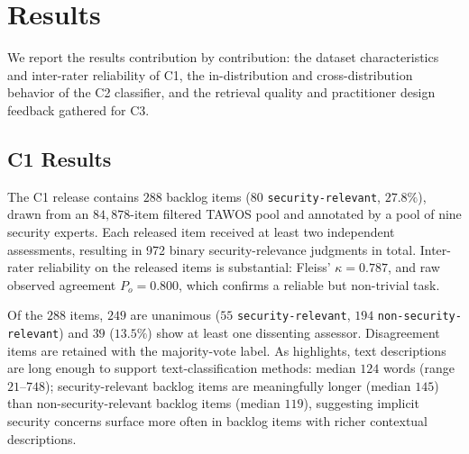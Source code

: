 \section{Results}
We report the results contribution by contribution: the dataset characteristics and inter-rater reliability of C1, the in-distribution and cross-distribution behavior of the C2 classifier, and the retrieval quality and practitioner design feedback gathered for C3.

\subsection*{C1 Results}
The C1 release contains $288$ backlog items ($80$ \texttt{security-relevant}, $27.8\%$), drawn from an $84{,}878$-item filtered TAWOS pool and annotated by a pool of nine security experts.
Each released item received at least two independent assessments, resulting in 972 binary security-relevance judgments in total. 
Inter-rater reliability on the released items is substantial: Fleiss' $\kappa = 0.787$, and raw observed agreement $P_o = 0.800$, which confirms a reliable but non-trivial task.

Of the $288$ items, $249$ are unanimous ($55$ \texttt{security-relevant}, $194$ \texttt{non-security-relevant}) and $39$ ($13.5\%$) show at least one dissenting assessor. Disagreement items are retained with the majority-vote label.
As  highlights, text descriptions are long enough to support text-classification methods: median $124$ words (range $21$--$748$); security-relevant backlog items are meaningfully longer (median $145$) than non-security-relevant backlog items (median $119$), suggesting implicit security concerns surface more often in backlog items with richer contextual descriptions.

